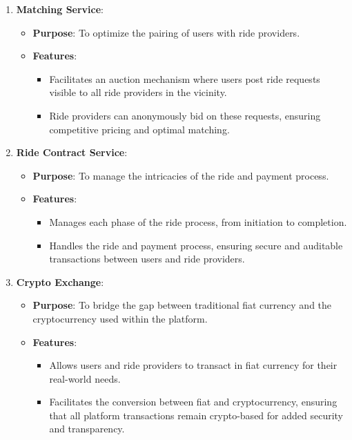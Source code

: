 \begin{enumerate}
    \item \textbf{Matching Service}:
    \begin{itemize}
        \item \textbf{Purpose}: To optimize the pairing of users with ride providers.
        \item \textbf{Features}:
        \begin{itemize}
            \item Facilitates an auction mechanism where users post ride requests visible to all ride providers in the vicinity.
            \item Ride providers can anonymously bid on these requests, ensuring competitive pricing and optimal matching.
        \end{itemize}
    \end{itemize}

    \item \textbf{Ride Contract Service}:
    \begin{itemize}
        \item \textbf{Purpose}: To manage the intricacies of the ride and payment process.
        \item \textbf{Features}:
        \begin{itemize}
            \item Manages each phase of the ride process, from initiation to completion.
            \item Handles the ride and payment process, ensuring secure and auditable transactions between users and ride providers.
        \end{itemize}
    \end{itemize}

    \item \textbf{Crypto Exchange}:
    \begin{itemize}
        \item \textbf{Purpose}: To bridge the gap between traditional fiat currency and the cryptocurrency used within the platform.
        \item \textbf{Features}:
        \begin{itemize}
            \item Allows users and ride providers to transact in fiat currency for their real-world needs.
            \item Facilitates the conversion between fiat and cryptocurrency, ensuring that all platform transactions remain crypto-based for added security and transparency.
        \end{itemize}
    \end{itemize}
\end{enumerate}

